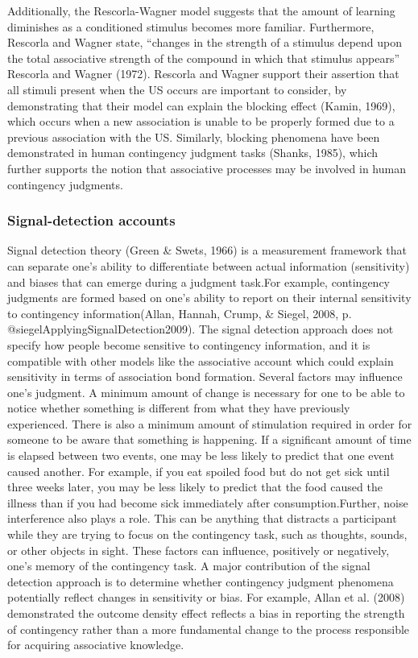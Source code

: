 \documentclass[
  english,
  man,floatsintext]{apa6}
\begin{document}
Additionally, the Rescorla-Wagner model suggests that the amount of learning diminishes as a conditioned stimulus becomes more familiar. Furthermore, Rescorla and Wagner state, \enquote{changes in the strength of a stimulus depend upon the total associative strength of the compound in which that stimulus appears} Rescorla and Wagner (1972). Rescorla and Wagner support their assertion that all stimuli present when the US occurs are important to consider, by demonstrating that their model can explain the blocking effect (Kamin, 1969), which occurs when a new association is unable to be properly formed due to a previous association with the US. Similarly, blocking phenomena have been demonstrated in human contingency judgment tasks (Shanks, 1985), which further supports the notion that associative processes may be involved in human contingency judgments.

\hypertarget{signal-detection-accounts}{%
\subsubsection{Signal-detection accounts}\label{signal-detection-accounts}}

Signal detection theory (Green \& Swets, 1966) is a measurement framework that can separate one's ability to differentiate between actual information (sensitivity) and biases that can emerge during a judgment task.For example, contingency judgments are formed based on one's ability to report on their internal sensitivity to contingency information(Allan, Hannah, Crump, \& Siegel, 2008, p. @siegelApplyingSignalDetection2009). The signal detection approach does not specify how people become sensitive to contingency information, and it is compatible with other models like the associative account which could explain sensitivity in terms of association bond formation. Several factors may influence one's judgment. A minimum amount of change is necessary for one to be able to notice whether something is different from what they have previously experienced. There is also a minimum amount of stimulation required in order for someone to be aware that something is happening. If a significant amount of time is elapsed between two events, one may be less likely to predict that one event caused another. For example, if you eat spoiled food but do not get sick until three weeks later, you may be less likely to predict that the food caused the illness than if you had become sick immediately after consumption.Further, noise interference also plays a role. This can be anything that distracts a participant while they are trying to focus on the contingency task, such as thoughts, sounds, or other objects in sight. These factors can influence, positively or negatively, one's memory of the contingency task. A major contribution of the signal detection approach is to determine whether contingency judgment phenomena potentially reflect changes in sensitivity or bias. For example, Allan et al. (2008) demonstrated the outcome density effect reflects a bias in reporting the strength of contingency rather than a more fundamental change to the process responsible for acquiring associative knowledge.
\end{document}
